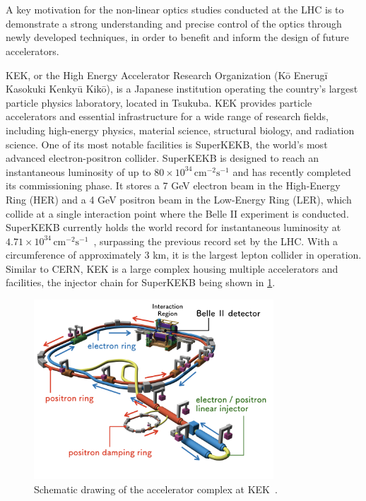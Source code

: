 \section{}

A key motivation for the non-linear optics studies conducted at the LHC is to demonstrate a strong
understanding and precise control of the optics through newly developed techniques, in order to
benefit and inform the design of future accelerators.

KEK, or the High Energy Accelerator Research Organization (Kō Enerugī Kasokuki Kenkyū Kikō), is a
Japanese institution operating the country's largest particle physics laboratory, located in
Tsukuba. KEK provides particle accelerators and essential infrastructure for a wide range of
research fields, including high-energy physics, material science, structural biology, and radiation
science. One of its most notable facilities is SuperKEKB, the world's most advanced
electron-positron collider. SuperKEKB is designed to reach an instantaneous luminosity of up to $80
\times 10^{34} \, \text{cm}^{-2}\text{s}^{-1}$ and has recently completed its commissioning phase.
It stores a 7 GeV electron beam in the High-Energy Ring (HER) and a 4 GeV positron beam in the
Low-Energy Ring (LER), which collide at a single interaction point where the Belle II experiment is
conducted. SuperKEKB currently holds the world record for instantaneous luminosity at $4.71 \times
10^{34} \, \text{cm}^{-2}\text{s}^{-1}$~\cite{zhou_luminosity_2023}, surpassing the previous record
set by the LHC. With a circumference of approximately 3 km, it is the largest lepton collider in
operation. Similar to CERN, KEK is a large complex housing multiple accelerators and facilities,
the injector chain for SuperKEKB being shown in \cref{fig:kek:layout_superkekb}.

\begin{figure}[!htb]
    \centering
    \includegraphics[width=0.8\textwidth]{./images/kek/layout_kekb.jpg}
    \caption{Schematic drawing of the accelerator complex at KEK~\cite{noauthor_operation_2024}.}
    \label{fig:kek:layout_superkekb}
\end{figure}

